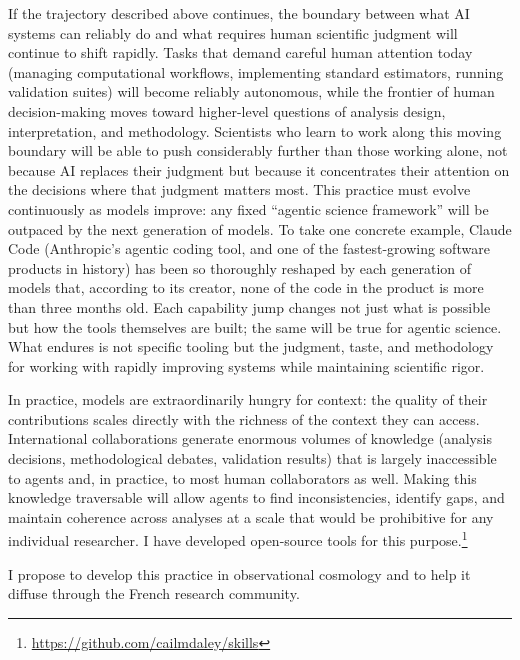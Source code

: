 \documentclass[11pt, a4paper]{article}
\begin{document}
If the trajectory described above continues, the boundary between what AI systems can reliably do and what requires human scientific judgment will continue to shift rapidly.
Tasks that demand careful human attention today (managing computational workflows, implementing standard estimators, running validation suites) will become reliably autonomous, while the frontier of human decision-making moves toward higher-level questions of analysis design, interpretation, and methodology.
Scientists who learn to work along this moving boundary will be able to push considerably further than those working alone, not because AI replaces their judgment but because it concentrates their attention on the decisions where that judgment matters most.
This practice must evolve continuously as models improve: any fixed ``agentic science framework'' will be outpaced by the next generation of models.
To take one concrete example, Claude Code (Anthropic's agentic coding tool, and one of the fastest-growing software products in history) has been so thoroughly reshaped by each generation of models that, according to its creator, none of the code in the product is more than three months old.
Each capability jump changes not just what is possible but how the tools themselves are built; the same will be true for agentic science.
What endures is not specific tooling but the judgment, taste, and methodology for working with rapidly improving systems while maintaining scientific rigor.

In practice, models are extraordinarily hungry for context: the quality of their contributions scales directly with the richness of the context they can access.
International collaborations generate enormous volumes of knowledge (analysis decisions, methodological debates, validation results) that is largely inaccessible to agents and, in practice, to most human collaborators as well.
Making this knowledge traversable will allow agents to find inconsistencies, identify gaps, and maintain coherence across analyses at a scale that would be prohibitive for any individual researcher.
I have developed open-source tools for this purpose.\footnote{\url{https://github.com/cailmdaley/skills}}

I propose to develop this practice in observational cosmology and to help it diffuse through the French research community.
\end{document}
